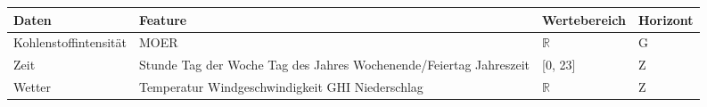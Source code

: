 \begin{tabularx}{\textwidth}{|X|X|X|X|}
    \hline
    Daten & Feature & Wertebereich & Horizont\tnote{a} \\ \hline \hline
    Kohlenstoffintensität & MOER & $\mathbb{R}$ & G \\ \hline
    Zeit & Stunde \newline Tag der Woche \newline Tag des Jahres \newline Wochenende/Feiertag \newline Jahreszeit & [0, 23] \newline [0, 6] \newline [1, 365] \newline [0, 1] \newline [0, 3] & Z \\ \hline
    Wetter & Temperatur \newline Windgeschwindigkeit \newline GHI \newline Niederschlag & $\mathbb{R}$ & Z\\ \hline
\end{tabularx}


